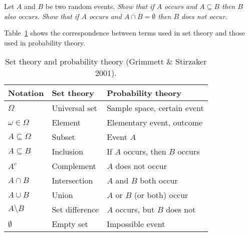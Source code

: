 \begin{exercise}
Let $A$ and $B$ be two random events.
\ben
\it Show that if $A$ occurs and $A\subseteq B$ then $B$ also occurs.
\it Show that if $A$ occurs and $A\cap B=\emptyset$ then $B$ does not occur. 
\een
\end{exercise}

Table~\ref{tab:sets_and_probability} shows the correspondence between terms used in set theory and those used in probability theory.
\begin{table}[ht]
\centering
\begin{tabular}{|l|l|l|} \hline
Notation 			& Set theory		& Probability theory \\ \hline
$\Omega$			& Universal set		& Sample space, certain event \\ 
$\omega\in\Omega$	& Element			& Elementary event, outcome \\
$A\subseteq\Omega$	& Subset			& Event $A$ \\
$A\subseteq B$		& Inclusion			& If $A$ occurs, then $B$ occurs \\
$A^c$				& Complement		& $A$ does not occur \\
$A\cap B$			& Intersection		& $A$ and $B$ both occur\\ 
$A\cup B$			& Union				& $A$ or $B$ (or both) occur \\ 
$A\setminus B$		& Set difference	& $A$ occurs, but $B$ does not \\ 
$\emptyset$			& Empty set			& Impossible event \\ \hline
\end{tabular}
\captionsetup{justification=centering}
\caption{Set theory and probability theory (Grimmett \& Stirzaker 2001).\label{tab:sets_and_probability}}
\end{table}





